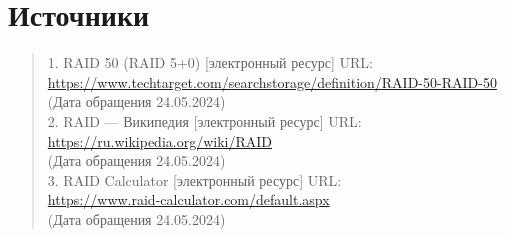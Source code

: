 \documentclass[10pt,a4paper,final]{article} %
\begin{document}
\newpage
\section* {Источники}
\begin{quote}
	1. RAID 50 (RAID 5+0) [электронный ресурс] URL:\\ \href{https://www.techtarget.com/searchstorage/definition/RAID-50-RAID-50}{https://www.techtarget.com/searchstorage/definition/RAID-50-RAID-50}\\
	(Дата обращения 24.05.2024)\\
	2. RAID — Википедия [электронный ресурс] URL:\\
	\href{https://ru.wikipedia.org/wiki/RAID}{https://ru.wikipedia.org/wiki/RAID} \\
	(Дата обращения 24.05.2024)\\
	3. RAID Calculator [электронный ресурс] URL:\\ \href{https://www.raid-calculator.com/default.aspx}{https://www.raid-calculator.com/default.aspx} \\
	(Дата обращения 24.05.2024)\\
\end{quote}
\end{document}
